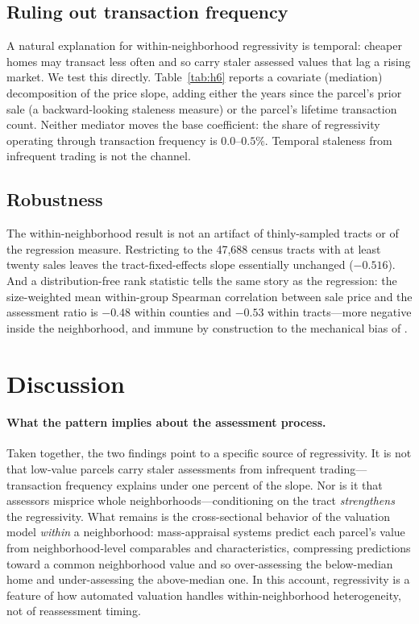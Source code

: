 \documentclass[12pt, letterpaper]{article}
\begin{document}


\subsection{Ruling out transaction frequency}

A natural explanation for within-neighborhood regressivity is temporal: cheaper homes may transact less often and so carry staler assessed values that lag a rising market. We test this directly. Table~\ref{tab:h6} reports a covariate (mediation) decomposition of the price slope, adding either the years since the parcel's prior sale (a backward-looking staleness measure) or the parcel's lifetime transaction count. Neither mediator moves the base coefficient: the share of regressivity operating through transaction frequency is $0.0$--$0.5\%$. Temporal staleness from infrequent trading is not the channel.



\subsection{Robustness}

The within-neighborhood result is not an artifact of thinly-sampled tracts or of the regression measure. Restricting to the 47{,}688 census tracts with at least twenty sales leaves the tract-fixed-effects slope essentially unchanged ($-0.516$). And a distribution-free rank statistic tells the same story as the regression: the size-weighted mean within-group Spearman correlation between sale price and the assessment ratio is $-0.48$ within counties and $-0.53$ within tracts---more negative inside the neighborhood, and immune by construction to the mechanical bias of \citet{mcmillen2023measures}.

\section{Discussion}\label{sec:discussion}

\paragraph{What the pattern implies about the assessment process.} Taken together, the two findings point to a specific source of regressivity. It is not that low-value parcels carry staler assessments from infrequent trading---transaction frequency explains under one percent of the slope. Nor is it that assessors misprice whole neighborhoods---conditioning on the tract \emph{strengthens} the regressivity. What remains is the cross-sectional behavior of the valuation model \emph{within} a neighborhood: mass-appraisal systems predict each parcel's value from neighborhood-level comparables and characteristics, compressing predictions toward a common neighborhood value and so over-assessing the below-median home and under-assessing the above-median one. In this account, regressivity is a feature of how automated valuation handles within-neighborhood heterogeneity, not of reassessment timing.
\end{document}
